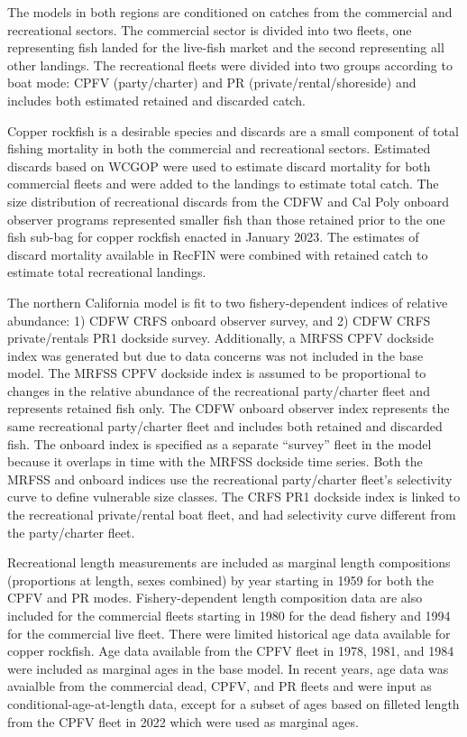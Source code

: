 \documentclass[11pt,
  english,
  letterpaper,
]{article}
\begin{document}
The models in both regions are conditioned on catches from the commercial and recreational sectors. The commercial sector is divided into two fleets, one representing fish landed for the live-fish market and the second representing all other landings. The recreational fleets were divided into two groups according to boat mode: CPFV (party/charter) and PR (private/rental/shoreside) and includes both estimated retained and discarded catch.

Copper rockfish is a desirable species and discards are a small component of total fishing mortality in both the commercial and recreational sectors. Estimated discards based on WCGOP were used to estimate discard mortality for both commercial fleets and were added to the landings to estimate total catch. The size distribution of recreational discards from the CDFW and Cal Poly onboard observer programs represented smaller fish than those retained prior to the one fish sub-bag for copper rockfish enacted in January 2023. The estimates of discard mortality available in RecFIN were combined with retained catch to estimate total recreational landings.

The northern California model is fit to two fishery-dependent indices of relative abundance: 1) CDFW CRFS onboard observer survey, and 2) CDFW CRFS private/rentals PR1 dockside survey. Additionally, a MRFSS CPFV dockside index was generated but due to data concerns was not included in the base model. The MRFSS CPFV dockside index is assumed to be proportional to changes in the relative abundance of the recreational party/charter fleet and represents retained fish only. The CDFW onboard observer index represents the same recreational party/charter fleet and includes both retained and discarded fish. The onboard index is specified as a separate ``survey'' fleet in the model because it overlaps in time with the MRFSS dockside time series. Both the MRFSS and onboard indices use the recreational party/charter fleet's selectivity curve to define vulnerable size classes. The CRFS PR1 dockside index is linked to the recreational private/rental boat fleet, and had selectivity curve different from the party/charter fleet.

Recreational length measurements are included as marginal length compositions (proportions at length, sexes combined) by year starting in 1959 for both the CPFV and PR modes. Fishery-dependent length composition data are also included for the commercial fleets starting in 1980 for the dead fishery and 1994 for the commercial live fleet. There were limited historical age data available for copper rockfish. Age data available from the CPFV fleet in 1978, 1981, and 1984 were included as marginal ages in the base model. In recent years, age data was avaialble from the commercial dead, CPFV, and PR fleets and were input as conditional-age-at-length data, except for a subset of ages based on filleted length from the CPFV fleet in 2022 which were used as marginal ages.
\end{document}
